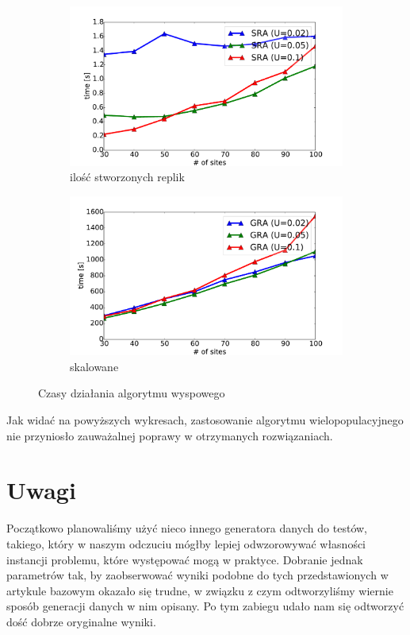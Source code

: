\documentclass[11pt,pdftex,a4paper]{scrartcl}
\begin{document}
\begin{figure}[H]
    \centering
    \begin{subfigure}[b]{0.49\textwidth} 
        \includegraphics[width=\textwidth]{plots/time_sra_isl}
        \caption{ilość stworzonych replik}
    \end{subfigure}
    \begin{subfigure}[b]{0.49\textwidth}
        \includegraphics[width=\textwidth]{plots/time_gra_isl}
        \caption{skalowane}
    \end{subfigure}

    \caption{Czasy działania algorytmu wyspowego}
    \label{plot:original}
\end{figure}

Jak widać na powyższych wykresach, zastosowanie algorytmu wielopopulacyjnego nie przyniosło zauważalnej
poprawy w otrzymanych rozwiązaniach.


\section{Uwagi}
Początkowo planowaliśmy użyć nieco innego generatora danych do testów, takiego, który w naszym odczuciu
mógłby lepiej odwzorowywać własności instancji problemu, które występować mogą w praktyce. Dobranie 
jednak parametrów tak, by zaobserwować wyniki podobne do tych przedstawionych w artykule bazowym okazało
się trudne, w związku z czym odtworzyliśmy wiernie sposób generacji danych w nim opisany. Po tym zabiegu
udało nam się odtworzyć dość dobrze oryginalne wyniki. 
\end{document}
